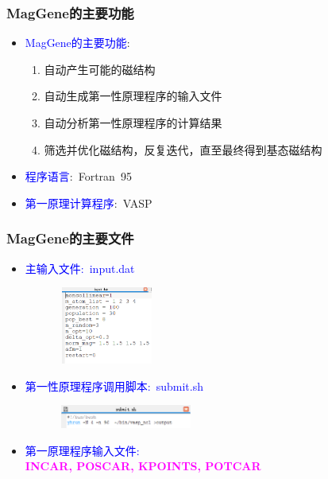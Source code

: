 \documentclass[cjk,slidestop,compress,mathserif,blue]{beamer}
\begin{document}
\frame
{
	\frametitle{\textrm{MagGene}的主要功能}
	\begin{itemize}
                \setlength{\itemsep}{15pt}
		\item \textcolor{blue}{\textrm{MagGene}的主要功能}:
			\begin{enumerate}
                                \setlength{\itemsep}{10pt}
				\item 自动产生可能的磁结构
				\item 自动生成第一性原理程序的输入文件
				\item 自动分析第一性原理程序的计算结果
				\item 筛选并优化磁结构，反复迭代，直至最终得到基态磁结构
			\end{enumerate}
		\item \textcolor{blue}{程序语言}:~\textrm{Fortran~95}
		\item \textcolor{blue}{第一原理计算程序}:~\textrm{VASP}
	\end{itemize}
}

\frame
{
	\frametitle{\textrm{MagGene}的主要文件}
	\begin{itemize}
		\item \textcolor{blue}{主输入文件:~\textrm{input.dat}}
\begin{figure}[h!]
	\vspace{-0.10in}
\centering
\includegraphics[height=1.0in,width=1.3in, viewport=0 20 400 290, clip]{Figures/MagGene-input.png}
\label{Fig:MagGene-input}
\end{figure}
\item \textcolor{blue}{第一性原理程序调用脚本:~\textrm{submit.sh}}
\begin{figure}[h!]
	\vspace{-0.08in}
\centering
\includegraphics[height=0.3in,width=1.8in, viewport=0 0 320 60, clip]{Figures/MagGene-submit-VASP.png}
\label{Fig:MagGene-script-VASP}
\end{figure}
\item \textcolor{blue}{第一原理程序输入文件:}\\
	\vspace{0.08in}
	\textcolor{magenta}{\textbf{INCAR, POSCAR, KPOINTS, POTCAR}}
	\end{itemize}
}
\end{document}
